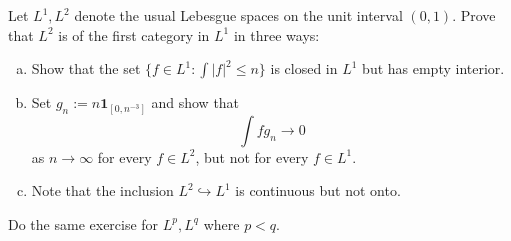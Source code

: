 \begin{exercise}[Ex.\ 2.4]
	Let $L^1, L^2$ denote the usual Lebesgue spaces on the unit interval $(0,1)$. Prove that $L^2$ is of the first category in $L^1$ in three ways:
	\begin{enumerate}[(a)]
		\item Show that the set $\{ f\in L^1 : \int |f|^2 \le n\}$ is closed in $L^1$ but has empty interior.
		\item Set $g_n := n \mathbf{1}_{[0, n^{-3}]}$ and show that
		\begin{equation*}
			\int fg_n \longrightarrow 0
		\end{equation*}
		as $n \to \infty$ for every $f\in L^2$, but not for every $f\in L^1$.
		\item Note that the inclusion $L^2 \hookrightarrow L^1$ is continuous but not onto.
	\end{enumerate}
	Do the same exercise for $L^p, L^q$ where $p<q$.
\end{exercise}

